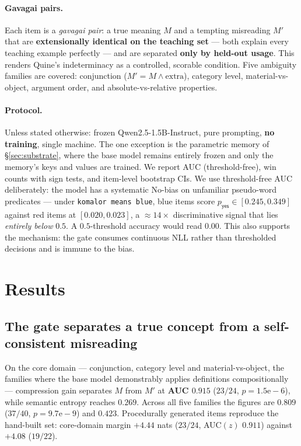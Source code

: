 \documentclass[11pt]{article}
\newcommand{\M}{\ensuremath{M}}
\newcommand{\Mp}{\ensuremath{M'}}
\begin{document}
\paragraph{Gavagai pairs.}
Each item is a \emph{gavagai pair}: a true meaning \M{} and a tempting misreading \Mp{} that
are \textbf{extensionally identical on the teaching set} --- both explain every teaching
example perfectly --- and are separated \textbf{only by held-out usage}. This renders
Quine's indeterminacy as a controlled, scorable condition. Five ambiguity families are
covered: conjunction ($\Mp = \M \wedge \text{extra}$), category level,
material-vs-object, argument order, and absolute-vs-relative properties.

\paragraph{Protocol.}
Unless stated otherwise: frozen Qwen2.5-1.5B-Instruct, pure prompting, \textbf{no
training}, single machine. The one exception is the parametric memory of
\S\ref{sec:substrate}, where the base model remains entirely frozen and only the memory's
keys and values are trained. We report AUC (threshold-free), win counts with sign tests,
and item-level bootstrap CIs. We use threshold-free AUC deliberately: the model has a
systematic \textsf{No}-bias on unfamiliar pseudo-word predicates --- under
\texttt{komalor means blue}, blue items score $p_{\textsf{yes}} \in [0.245, 0.349]$ against
red items at $[0.020, 0.023]$, a $\approx 14\times$ discriminative signal that lies
\emph{entirely below} $0.5$. A $0.5$-threshold accuracy would read $0.00$. This also
supports the mechanism: the gate consumes continuous NLL rather than thresholded decisions
and is immune to the bias.

\section{Results}

\subsection{The gate separates a true concept from a self-consistent misreading}

On the core domain --- conjunction, category level and material-vs-object, the families
where the base model demonstrably applies definitions compositionally --- compression gain
separates \M{} from \Mp{} at \textbf{AUC $0.915$} ($23/24$, $p = 1.5\mathrm{e}{-}6$), while
semantic entropy reaches $0.269$. Across all five families the figures are $0.809$
($37/40$, $p = 9.7\mathrm{e}{-}9$) and $0.423$. Procedurally generated items reproduce the
hand-built set: core-domain margin $+4.44$ nats ($23/24$, AUC$(z)$ $0.911$) against
$+4.08$ ($19/22$).
\end{document}

